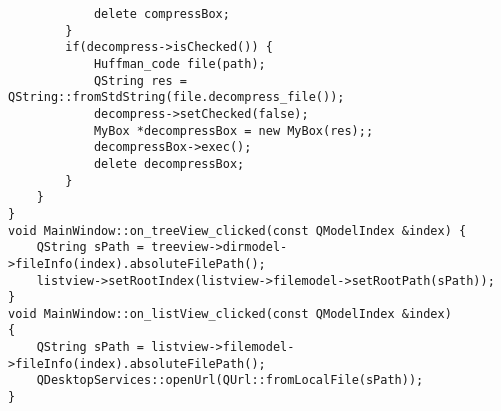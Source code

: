 \begin{verbatim}
            delete compressBox;
        }
        if(decompress->isChecked()) {
            Huffman_code file(path);
            QString res = QString::fromStdString(file.decompress_file());
            decompress->setChecked(false);
            MyBox *decompressBox = new MyBox(res);;
            decompressBox->exec();
            delete decompressBox;
        }
    }
}
void MainWindow::on_treeView_clicked(const QModelIndex &index) {
    QString sPath = treeview->dirmodel->fileInfo(index).absoluteFilePath();
    listview->setRootIndex(listview->filemodel->setRootPath(sPath));
}
void MainWindow::on_listView_clicked(const QModelIndex &index)
{
    QString sPath = listview->filemodel->fileInfo(index).absoluteFilePath();
    QDesktopServices::openUrl(QUrl::fromLocalFile(sPath));
}
\end{verbatim}

